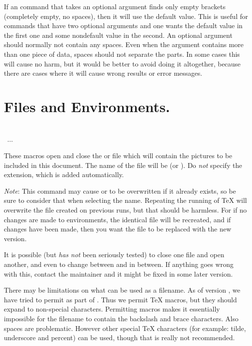 \documentclass[letterpaper]{article}
\begin{document}
If an \mfp{} command that takes an optional argument finds only empty
brackets (completely empty, no spaces), then it will use the default
value. This is useful for commands that have two optional arguments and
one wants the default value in the first one and some nondefault value
in the second. An optional argument should normally not contain any
spaces. Even when the argument contains more than one piece of data,
spaces should not separate the parts. In some cases this will cause no
harm, but it would be better to avoid doing it altogether, because there
are cases where it will cause wrong results or error messages.


\section{Files and Environments.}\label{files}

\begin{cd}
\\
  \ $\ldots$\\
%
%
\end{cd}

These macros open and close the \MF{} or \MP{} file which will contain
the pictures to be included in this document.  The name of the file will
be  (or ). Do \emph{not}
specify the extension, which is added automatically.

\emph{Note}: This command may cause  or
 to be overwritten if it already exists, so be sure
to consider that when selecting the name. Repeating the running of
\TeX{} will overwrite the file created on previous runs, but that should
be harmless. For if no changes are made to  environments, the
identical file will be recreated, and if changes have been made, then
you want the file to be replaced with the new version.

It is possible (but \emph{has not} been seriously tested) to close one
file and open another, and even to change between  and
 in between. If anything goes wrong with this, contact the
maintainer and it might be fixed in some later version.

There may be limitations on what can be used as a filename. As of \mfp{}
version \mfpversion, we have tried to permit  as part of
. Thus we permit \TeX{} macros, but they should expand to
non-special characters. Permitting macros makes it essentially
impossible for the filename to contain the backslash and brace
characters. Also spaces are problematic. However other special \TeX{}
characters (for example: tilde, underscore and percent) can be used,
though that is really not recommended.
\end{document}
